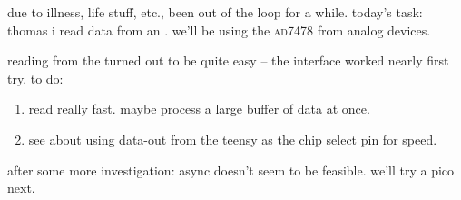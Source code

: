 due to illness, life stuff, etc., been out of the loop for a while. today's
task: thomas \amp i read data from an \adc. we'll be using the \textsc{ad7478}
from analog devices.

reading from the \adc turned out to be quite easy -- the \spi interface worked
nearly first try. to do:
\begin{enumerate}
	\item read really fast. maybe process a large buffer of \spi data at
	once.
	\item see about using data-out from the teensy as the chip select pin
	for speed.
\end{enumerate}

after some more investigation: async \spi doesn't seem to be feasible. we'll
try a pico next.
